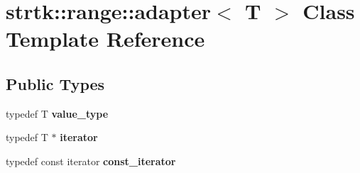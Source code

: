 \hypertarget{classstrtk_1_1range_1_1adapter}{\section{strtk\-:\-:range\-:\-:adapter$<$ T $>$ Class Template Reference}
\label{classstrtk_1_1range_1_1adapter}
}
\subsection*{Public Types}
\begin{DoxyCompactItemize}
\item 
\hypertarget{classstrtk_1_1range_1_1adapter_af9eed302ef5bca267af1715081d8a069}{typedef T {\bfseries value\-\_\-type}}\label{classstrtk_1_1range_1_1adapter_af9eed302ef5bca267af1715081d8a069}

\item 
\hypertarget{classstrtk_1_1range_1_1adapter_a8ea493b2f564ba5c1e41cc67398badde}{typedef T $\ast$ {\bfseries iterator}}\label{classstrtk_1_1range_1_1adapter_a8ea493b2f564ba5c1e41cc67398badde}

\item 
\hypertarget{classstrtk_1_1range_1_1adapter_a92952ab2adca1af01f3820f7638e6285}{typedef const iterator {\bfseries const\-\_\-iterator}}\label{classstrtk_1_1range_1_1adapter_a92952ab2adca1af01f3820f7638e6285}

\end{DoxyCompactItemize}
